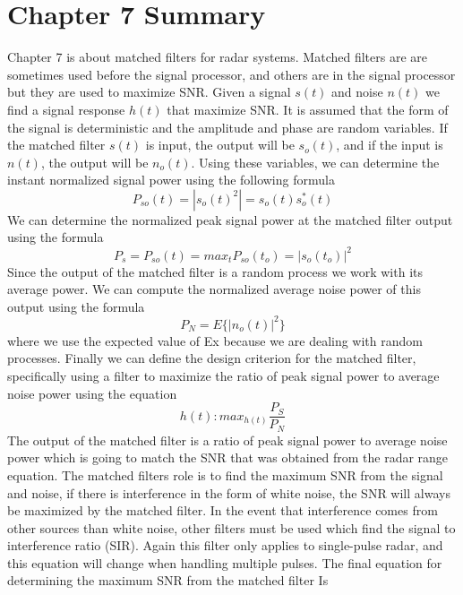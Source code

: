 \documentclass[12pt]{article}
\begin{document}
\section{Chapter 7 Summary}
Chapter 7 is about matched filters for radar systems. Matched filters are are sometimes used before the signal processor, and others are in the signal processor but they are used to maximize SNR. Given a signal $s(t)$ and noise $n(t)$ we find a signal response $h(t)$ that maximize SNR. It is assumed that the form of the signal is deterministic and the amplitude and phase are random variables. If the matched filter $s(t)$ is input, the output will be $s_o(t)$, and if the input is $n(t)$, the output will be $n_o(t)$. Using these variables, we can determine the instant normalized signal power using the following formula
\begin{equation}
    P_{so} (t) = |s_o (t)^2 | = s_o (t) s_o^*(t)
\end{equation}
We can determine the normalized peak signal power at the matched filter output using the formula 
\begin{equation}
    P_s = P_{so}(t) = max_t P_{so}(t_o) = |s_o(t_o)|^2 
\end{equation}
Since the output of the matched filter is a random process we work with its average power. We can compute the normalized average noise power of this output using the formula
\begin{equation}
    P_N = E \{ |n_o (t)|^2 \} 
\end{equation}
where we use the expected value of E{x} because we are dealing with random processes. Finally we can define the design criterion for the matched filter, specifically using a filter to maximize the ratio of peak signal power to average noise power using the equation
\begin{equation}
    h(t):max_{h(t)} \frac{P_S}{P_N}
\end{equation}
The output of the matched filter is a ratio of peak signal power to average noise power which is going to match the SNR that was obtained from the radar range equation. The matched filters role is to find the maximum SNR from the signal and noise, if there is interference in the form of white noise, the SNR will always be maximized by the matched filter. In the event that interference comes from other sources than white noise, other filters must be used which find the signal to interference ratio (SIR). Again this filter only applies to single-pulse radar, and this equation will change when handling multiple pulses. The final equation for determining the maximum SNR from the matched filter Is
\end{document}
